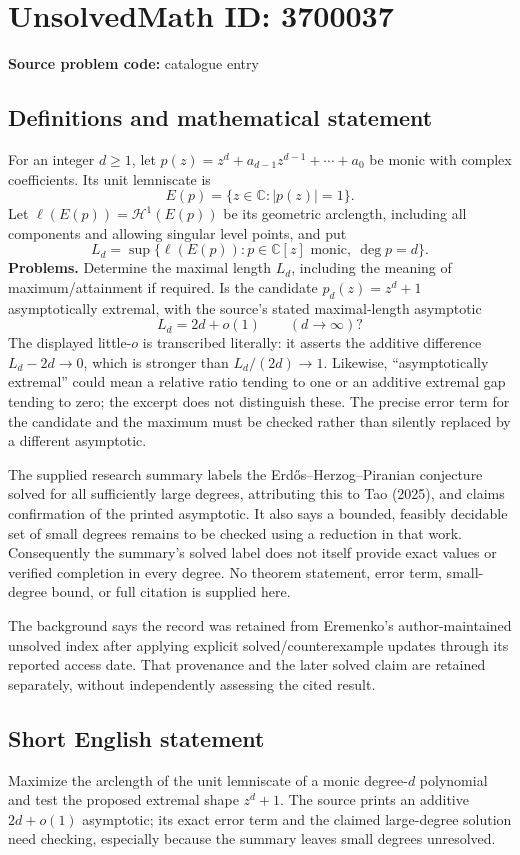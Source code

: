 \documentclass[11pt]{article}
\newcommand{\C}{\mathbb{C}}
\begin{document}
\section*{UnsolvedMath ID: 3700037}
\textbf{Source problem code:} catalogue entry
\subsection{Definitions and mathematical statement}
For an integer $d\geq1$, let $p(z)=z^d+a_{d-1}z^{d-1}+\cdots+a_0$ be monic with complex coefficients. Its unit lemniscate is
\[
 E(p)=\{z\in\C:|p(z)|=1\}.
\]
Let $\ell(E(p))=\mathcal H^1(E(p))$ be its geometric arclength, including all components and allowing singular level points, and put
\[
 L_d=\sup\{\ell(E(p)):p\in\C[z]\text{ monic},\ \deg p=d\}.
\]
\textbf{Problems.} Determine the maximal length $L_d$, including the meaning of maximum/attainment if required. Is the candidate $p_d(z)=z^d+1$ asymptotically extremal, with the source's stated maximal-length asymptotic
\[
 L_d=2d+o(1)\qquad(d\to\infty)?
\]
The displayed little-$o$ is transcribed literally: it asserts the additive difference $L_d-2d\to0$, which is stronger than $L_d/(2d)\to1$. Likewise, ``asymptotically extremal'' could mean a relative ratio tending to one or an additive extremal gap tending to zero; the excerpt does not distinguish these. The precise error term for the candidate and the maximum must be checked rather than silently replaced by a different asymptotic.

The supplied research summary labels the Erd\H{o}s--Herzog--Piranian conjecture solved for all sufficiently large degrees, attributing this to Tao (2025), and claims confirmation of the printed asymptotic. It also says a bounded, feasibly decidable set of small degrees remains to be checked using a reduction in that work. Consequently the summary's solved label does not itself provide exact values or verified completion in every degree. No theorem statement, error term, small-degree bound, or full citation is supplied here.

The background says the record was retained from Eremenko's author-maintained unsolved index after applying explicit solved/counterexample updates through its reported access date. That provenance and the later solved claim are retained separately, without independently assessing the cited result.
\subsection{Short English statement}
Maximize the arclength of the unit lemniscate of a monic degree-$d$ polynomial and test the proposed extremal shape $z^d+1$. The source prints an additive $2d+o(1)$ asymptotic; its exact error term and the claimed large-degree solution need checking, especially because the summary leaves small degrees unresolved.
\end{document}
